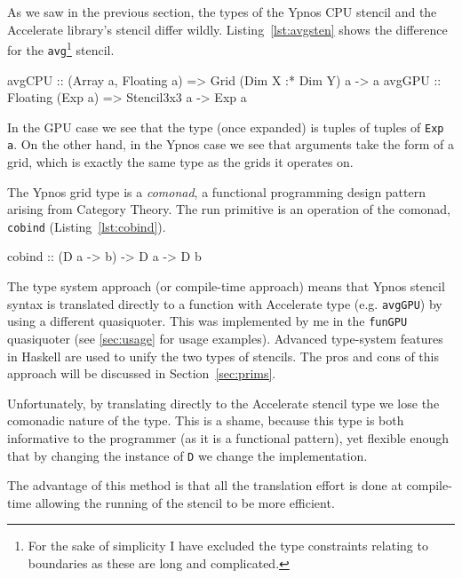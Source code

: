 \documentclass[
    12pt,
    a4paper,
    twoside,
    openright,
    ]{scrbook}
\begin{document}
As we saw in the previous section, the types of the Ypnos CPU stencil and the
Accelerate library's stencil differ wildly. Listing~\ref{lst:avgsten} shows the
difference for the \texttt{avg}\footnote{For the sake of simplicity I have
  excluded the type constraints relating to boundaries as these are long
  and complicated.}  stencil.

\begin{hflisting}[label={lst:avgsten}, caption={The average function implemented
    on both the CPU and GPU. Note the difference in types. The constraints are
    simplified.}]
avgCPU :: (Array a, Floating a) => Grid (Dim X :* Dim Y) a ->     a
avgGPU ::      Floating (Exp a) =>            Stencil3x3 a -> Exp a
\end{hflisting}

In the GPU case we see that the type (once expanded) is tuples of tuples of
\texttt{Exp a}. On the other hand, in the Ypnos case we see that arguments take
the form of a grid, which is exactly the same type as the grids it operates on.

The Ypnos grid type is a \emph{comonad}, a functional programming design pattern
arising from Category Theory. The run primitive is an operation of the comonad,
\texttt{cobind} (Listing~\ref{lst:cobind}).

\begin{hflisting}[label={lst:cobind}, caption={The definition of cobind. Let
    \texttt{D} be a grid of a certain dimension and \texttt{a} and \texttt{b} be
    the types of that grid.}]
cobind :: (D a -> b) -> D a -> D b
\end{hflisting}

The type system approach (or compile-time approach) means that Ypnos stencil
syntax is translated directly to a function with Accelerate type
(e.g. \texttt{avgGPU}) by using a different quasiquoter. This was implemented by
me in the \texttt{funGPU} quasiquoter (see \autoref{sec:usage} for usage
examples). Advanced type-system features in Haskell are used to unify the two
types of stencils. The pros and cons of this approach will be discussed in
Section~\ref{sec:prims}.

Unfortunately, by translating directly to the Accelerate stencil type we lose
the comonadic nature of the type. This is a shame, because this type is both
informative to the programmer (as it is a functional pattern), yet flexible
enough that by changing the instance of \texttt{D} we change the implementation.

The advantage of this method is that all the translation effort is done at
compile-time allowing the running of the stencil to be more efficient.
\end{document}
